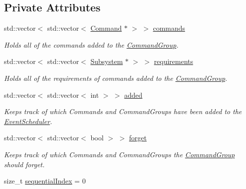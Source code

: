\subsection*{Private Attributes}
\begin{DoxyCompactItemize}
\item 
std\+::vector$<$ std\+::vector$<$ \mbox{\hyperlink{classlib_iterative_robot_1_1_command}{Command}} $\ast$ $>$ $>$ \mbox{\hyperlink{classlib_iterative_robot_1_1_command_group_aa7a293ed14071e183070e00580ccbecf}{commands}}
\begin{DoxyCompactList}\small\item\em Holds all of the commands added to the \mbox{\hyperlink{classlib_iterative_robot_1_1_command_group}{Command\+Group}}. \end{DoxyCompactList}\item 
std\+::vector$<$ std\+::vector$<$ \mbox{\hyperlink{classlib_iterative_robot_1_1_subsystem}{Subsystem}} $\ast$ $>$ $>$ \mbox{\hyperlink{classlib_iterative_robot_1_1_command_group_ad804d6ab2feaec9e95dde18706548a89}{requirements}}
\begin{DoxyCompactList}\small\item\em Holds all of the requirements of commands added to the \mbox{\hyperlink{classlib_iterative_robot_1_1_command_group}{Command\+Group}}. \end{DoxyCompactList}\item 
\mbox{\label{classlib_iterative_robot_1_1_command_group_a93fe86db750ed4c728626eace7e66a2f}} 
std\+::vector$<$ std\+::vector$<$ int $>$ $>$ \mbox{\hyperlink{classlib_iterative_robot_1_1_command_group_a93fe86db750ed4c728626eace7e66a2f}{added}}
\begin{DoxyCompactList}\small\item\em Keeps track of which Commands and Command\+Groups have been added to the \mbox{\hyperlink{classlib_iterative_robot_1_1_event_scheduler}{Event\+Scheduler}}. \end{DoxyCompactList}\item 
\mbox{\label{classlib_iterative_robot_1_1_command_group_ae6779a068983b84e265c0ff4fc74488d}} 
std\+::vector$<$ std\+::vector$<$ bool $>$ $>$ \mbox{\hyperlink{classlib_iterative_robot_1_1_command_group_ae6779a068983b84e265c0ff4fc74488d}{forget}}
\begin{DoxyCompactList}\small\item\em Keeps track of which Commands and Command\+Groups the \mbox{\hyperlink{classlib_iterative_robot_1_1_command_group}{Command\+Group}} should forget. \end{DoxyCompactList}\item 
size\+\_\+t \mbox{\hyperlink{classlib_iterative_robot_1_1_command_group_ae6ba0e30e4caa58f4b019ab496487ab7}{sequential\+Index}} = 0
\end{DoxyCompactItemize}
